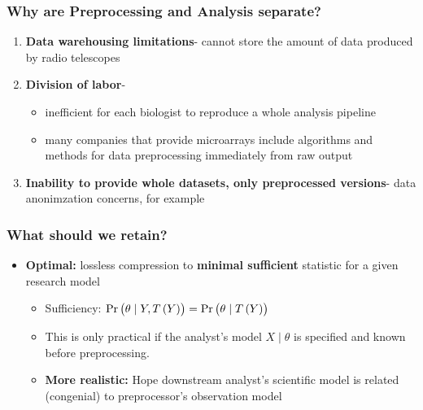 \documentclass[10pt, compress]{beamer}
\begin{document}
\begin{frame}[fragile]
    \frametitle{Why are Preprocessing and Analysis separate?}
    
    \begin{enumerate} 
    \item \textbf{Data warehousing limitations}- cannot store the amount of data produced by radio telescopes
    \vspace*{3mm}
    \item \textbf{Division of labor}- 
        \begin{itemize}
        \item inefficient for each biologist to reproduce a whole analysis pipeline 
        \item many companies that provide microarrays include algorithms and methods for data preprocessing immediately from raw output
        \end{itemize}
    \vspace*{3mm}
    \item \textbf{Inability to provide whole datasets, only preprocessed versions}- data anonimzation concerns, for example
    \end{enumerate}

\end{frame}

\begin{frame}[fragile]
    \frametitle{What should we retain?}
    \begin{itemize}
        \item \textbf{Optimal:} lossless compression to \textbf{minimal sufficient} statistic for a given research model
            \begin{itemize}
                \item Sufficiency: $\Pr\del{\theta \mid Y,T\del{Y}}=\Pr\del{\theta \mid T\del{Y}}$
                \item This is only practical if the analyst's model $X \mid \theta$ is specified and known before preprocessing.
                \item \textbf{More realistic:} Hope downstream analyst's scientific model is related (congenial) to preprocessor's observation model
            \end{itemize}
    \end{itemize}
\end{frame}
\end{document}

